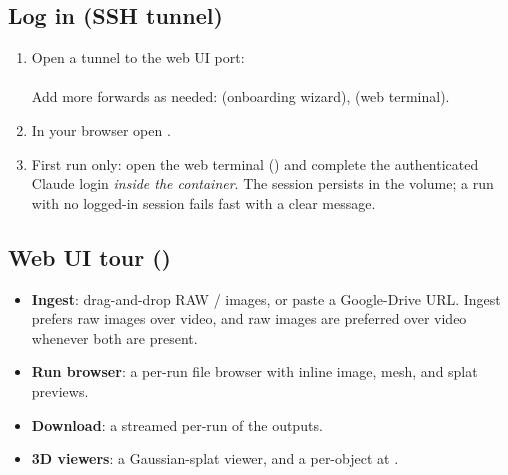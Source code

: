 \documentclass[a4paper,11pt]{article}
\begin{document}
\subsection{Log in (SSH tunnel)}
\begin{enumerate}
\item Open a tunnel to the web UI port:\\
      \\
      Add more  forwards as needed:  (onboarding wizard),
       (web terminal).
\item In your browser open .
\item First run only: open the web terminal () and complete the authenticated Claude
      login \emph{inside the container}. The session persists in the  volume; a
      run with no logged-in session fails fast with a clear message.
\end{enumerate}

\subsection{Web UI tour ()}
\begin{itemize}
\item \textbf{Ingest}: drag-and-drop RAW / images, or paste a Google-Drive URL. Ingest prefers raw
      images over video, and raw images are preferred over video whenever both are present.
\item \textbf{Run browser}: a per-run file browser with inline image, mesh, and splat previews.
\item \textbf{Download}: a streamed per-run  of the outputs.
\item \textbf{3D viewers}: a Gaussian-splat viewer, and a per-object  at
      .
\end{itemize}
\end{document}
